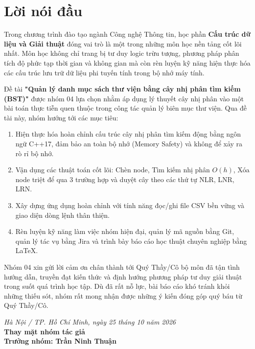 \chapter*{Lời nói đầu}

Trong chương trình đào tạo ngành Công nghệ Thông tin, học phần \textbf{Cấu trúc dữ liệu và Giải thuật} đóng vai trò là một trong những môn học nền tảng cốt lõi nhất. Môn học không chỉ trang bị tư duy logic trừu tượng, phương pháp phân tích độ phức tạp thời gian và không gian mà còn rèn luyện kỹ năng hiện thực hóa các cấu trúc lưu trữ dữ liệu phi tuyến tính trong bộ nhớ máy tính.

Đề tài \textbf{"Quản lý danh mục sách thư viện bằng cây nhị phân tìm kiếm (BST)"} được nhóm 04 lựa chọn nhằm áp dụng lý thuyết cây nhị phân vào một bài toán thực tiễn quen thuộc trong công tác quản lý biên mục thư viện. Qua đề tài này, nhóm hướng tới các mục tiêu:
\begin{enumerate}
    \item Hiện thực hóa hoàn chỉnh cấu trúc cây nhị phân tìm kiếm động bằng ngôn ngữ C++17, đảm bảo an toàn bộ nhớ (Memory Safety) và không để xảy ra rò rỉ bộ nhớ.
    \item Vận dụng các thuật toán cốt lõi: Chèn node, Tìm kiếm nhị phân $O(h)$, Xóa node triệt để qua 3 trường hợp và duyệt cây theo các thứ tự NLR, LNR, LRN.
    \item Xây dựng ứng dụng hoàn chỉnh với tính năng đọc/ghi file CSV bền vững và giao diện dòng lệnh thân thiện.
    \item Rèn luyện kỹ năng làm việc nhóm hiện đại, quản lý mã nguồn bằng Git, quản lý tác vụ bằng Jira và trình bày báo cáo học thuật chuyên nghiệp bằng \LaTeX.
\end{enumerate}

Nhóm 04 xin gửi lời cảm ơn chân thành tới Quý Thầy/Cô bộ môn đã tận tình hướng dẫn, truyền đạt kiến thức và định hướng phương pháp tư duy giải thuật trong suốt quá trình học tập. Dù đã rất nỗ lực, bài báo cáo khó tránh khỏi những thiếu sót, nhóm rất mong nhận được những ý kiến đóng góp quý báu từ Quý Thầy/Cô.

\begin{flushright}
    \textit{Hà Nội / TP. Hồ Chí Minh, ngày 25 tháng 10 năm 2026}\\
    \textbf{Thay mặt nhóm tác giả}\\
    \textbf{Trưởng nhóm: Trần Ninh Thuận}
\end{flushright}
